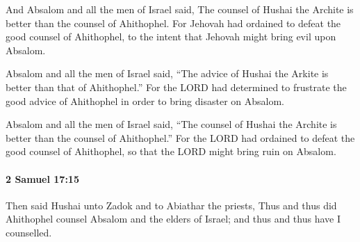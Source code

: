 			\begin{versebox}
					\item[BHS] 
					\item[ASV] And Absalom and all the men of Israel said, The counsel of Hushai the Archite is better than the counsel of Ahithophel. For Jehovah had ordained to defeat the good counsel of Ahithophel, to the intent that Jehovah might bring evil upon Absalom.
					\item[NIV] Absalom and all the men of Israel said, “The advice of Hushai the Arkite is better than that of Ahithophel.” For the LORD had determined to frustrate the good advice of Ahithophel in order to bring disaster on Absalom.
					\item[NRSV] Absalom and all the men of Israel said, “The counsel of Hushai the Archite is better than the counsel of Ahithophel.” For the LORD had ordained to defeat the good counsel of Ahithophel, so that the LORD might bring ruin on Absalom.
			\end{versebox}

		\paragraph{2 Samuel 17:15} %
			\label{2SAMUEL-17-15}

			Then said Hushai unto Zadok and to Abiathar the priests, Thus and thus did Ahithophel counsel Absalom and the elders of Israel; and thus and thus have I counselled.

